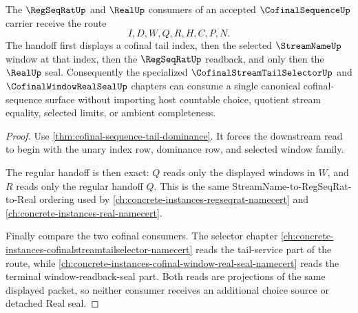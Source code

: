 \begin{theorem}\label{thm:cofinal-sequence-regseqrat-handoff}
The $\RegSeqRatUp$ and $\RealUp$ consumers of an accepted $\CofinalSequenceUp$ carrier receive the route
$$
I,D,W,Q,R,H,C,P,N.
$$
The handoff first displays a cofinal tail index, then the selected $\StreamNameUp$ window at that index, then the $\RegSeqRatUp$ readback, and only then the $\RealUp$ seal. Consequently the specialized $\CofinalStreamTailSelectorUp$ and $\CofinalWindowRealSealUp$ chapters can consume a single canonical cofinal-sequence surface without importing host countable choice, quotient stream equality, selected limits, or ambient completeness.
\end{theorem}
\begin{proof}
Use \autoref{thm:cofinal-sequence-tail-dominance}. It forces the downstream read to begin with the unary index row, dominance row, and selected window family.

The regular handoff is then exact: $Q$ reads only the displayed windows in $W$, and $R$ reads only the regular handoff $Q$. This is the same StreamName-to-RegSeqRat-to-Real ordering used by \autoref{ch:concrete-instances-regseqrat-namecert} and \autoref{ch:concrete-instances-real-namecert}.

Finally compare the two cofinal consumers. The selector chapter \autoref{ch:concrete-instances-cofinalstreamtailselector-namecert} reads the tail-service part of the route, while \autoref{ch:concrete-instances-cofinal-window-real-seal-namecert} reads the terminal window-readback-seal part. Both reads are projections of the same displayed packet, so neither consumer receives an additional choice source or detached Real seal.
\end{proof}




